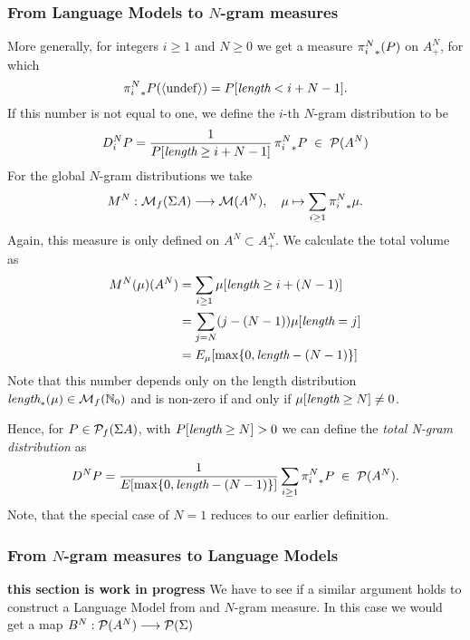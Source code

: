 \documentclass[11pt]{article}
\begin{document}

\subsubsection{From Language Models to $N$-gram measures}

More generally, for integers $i \geq 1$ and $N \geq 0$ we get a
measure ${\pi_{i}^{N}}_*(P)$ on $A^N_+$, for which
\[ {\pi_{i}^{N}}_* P (\langle \mathrm{undef} \rangle) =  P[\text{\it length} < i + N -1]. \]
If this number is not equal to one, we define the $i$-th $N$-gram
distribution to be
\[ D_i^N P = \frac{1}{P[\text{\it length} \geq i+N-1]} \, 
             {\pi_{i}^{N}}_* P \;\in\; \mathcal{P}(A^N) \]
For the global $N$-gram distributions we take
\[ M^N: \mathcal{M}_f(\Sigma A) \longrightarrow \mathcal{M}(A^N), \quad \mu \mapsto \sum_{i
\geq 1} {\pi_{i}^{N}}_* \mu. \]
Again, this measure is only defined on $A^N \subset A^N_+$.
We calculate the total volume as
\begin{align} 
  M^N(\mu)(A^N) &= \sum_{i \geq 1} \mu[\text{\it length} \geq i + (N-1)] \\
                &= \sum_{j = N} (j-(N-1)) \mu[\text{\it length} = j]    \\
                &= E_{\mu}[\max\{ 0, \text{\it length} - (N-1) \} ]  
\end{align}
Note that this number depends only on the length distribution
$\text{\it length}_*(\mu) \in \mathcal{M}_f({\mathbb N}_0)$ and is non-zero if and only if
$\mu[\text{\it length} \geq N] \neq 0$. 

Hence, for $P \in \mathcal{P}_f(\Sigma A)$, with $P[\text{\it length} \geq N] > 0$ we can define the
{\it total N-gram distribution} as
\[ D^N P = \frac{1}{E_{}[\max\{ 0, \text{\it length} - (N-1) \} ]}
           \sum_{i \geq 1} {\pi_{i}^{N}}_* P \;\in\; \mathcal{P}(A^N). \]
Note, that the special case of $N=1$ reduces to our earlier definition.

\subsubsection{From $N$-gram measures to Language Models}
\textbf{this section is work in progress}
We have to see if a similar argument holds to construct a Language Model from and $N$-gram measure. 
In this case we would get a map $B^N : \mathcal{P}(A^N) \longrightarrow \mathcal{P}(\Sigma)$

\newcommand{\BACK}[1]{{\partial^{#1}}}
\end{document}
